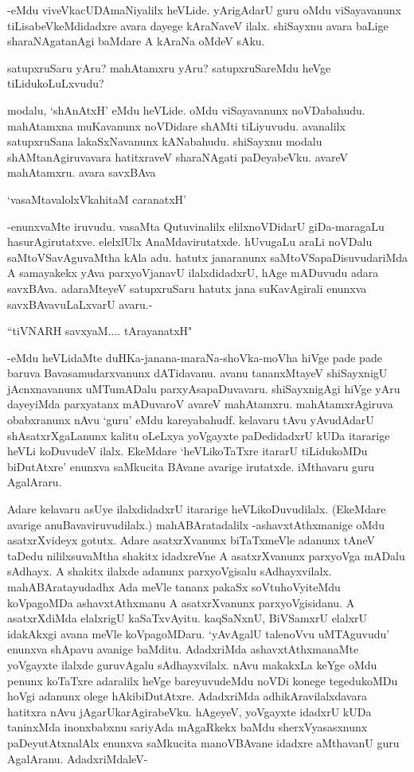 -eMdu viveVkacUDAmaNiyalilx heVLide. yArigAdarU guru oMdu viSayavanunx tiLisabeVkeMdidadxre avara dayege kAraNaveV ilalx. shiSayxnu avara baLige sharaNAgatanAgi baMdare A kAraNa oMdeV sAku.

satupxruSaru yAru? mahAtamxru yAru? satupxruSareMdu heVge tiLidukoLuLxvudu?

modalu, `shAnAtxH' eMdu heVLide. oMdu viSayavanunx noVDabahudu. mahAtamxna muKavanunx noVDidare shAMti tiLiyuvudu. avanalilx satupxruSana lakaSxNavanunx kANabahudu. shiSayxnu modalu shAMtanAgiruvavara hatitxraveV sharaNAgati paDeyabeVku. avareV mahAtamxru. avara savxBAva

\begin{shloka}
`vasaMtavalolxVkahitaM caranatxH'
\end{shloka}

-enunxvaMte iruvudu. vasaMta Qutuvinalilx elilxnoVDidarU giDa-maragaLu hasurAgirutatxve. elelxlUlx AnaMdavirutatxde. hUvugaLu araLi noVDalu saMtoVSavAguvaMtha kAla adu. hatutx janaranunx saMtoVSapaDisuvudariMda A samayakekx yAva parxyoVjanavU ilalxdidadxrU, hAge mADuvudu adara savxBAva. adaraMteyeV satupxruSaru hatutx jana suKavAgirali enunxva savxBAvavuLaLxvarU avaru.-

\begin{shloka}
``tiVNARH savxyaM.... tArayanatxH"
\end{shloka}

-eMdu heVLidaMte duHKa-janana-maraNa-shoVka-moVha hiVge pade pade baruva Bavasamudarxvanunx dATidavanu. avanu tananxMtayeV shiSayxnigU jAcnxnavanunx uMTumADalu parxyAsapaDuvavaru. shiSayxnigAgi hiVge yAru dayeyiMda parxyatanx mADuvaroV avareV mahAtamxru. mahAtamxrAgiruva obabxranunx nAvu `guru' eMdu kareyabahudf. kelavaru tAvu yAvudAdarU shAsatxrXgaLanunx kalitu oLeLxya yoVgayxte paDedidadxrU kUDa itararige heVLi koDuvudeV ilalx. EkeMdare `heVLikoTaTxre itararU tiLidukoMDu biDutAtxre' enunxva saMkucita BAvane avarige irutatxde. iMthavaru guru AgalAraru.

Adare kelavaru asUye ilalxdidadxrU itararige heVLikoDuvudilalx. (EkeMdare avarige anuBavaviruvudilalx.) mahABAratadalilx -ashavxtAthxmanige oMdu asatxrXvideyx gotutx. Adare asatxrXvanunx biTaTxmeVle adanunx tAneV taDedu nililxsuvaMtha shakitx idadxreVne A asatxrXvanunx parxyoVga mADalu sAdhayx. A shakitx ilalxde adanunx parxyoVgisalu sAdhayxvilalx. mahABAratayudadhx Ada meVle tananx pakaSx soVtuhoVyiteMdu koVpagoMDa ashavxtAthxmanu A asatxrXvanunx parxyoVgisidanu. A asatxrXdiMda elalxrigU kaSaTxvAyitu. kaqSaNxnU, BiVSamxrU elalxrU idakAkxgi avana meVle koVpagoMDaru. `yAvAgalU talenoVvu uMTAguvudu' enunxva shApavu avanige baMditu. AdadxriMda ashavxtAthxmanaMte yoVgayxte ilalxde guruvAgalu sAdhayxvilalx. nAvu makakxLa keYge oMdu penunx koTaTxre adaralilx heVge bareyuvudeMdu noVDi konege tegedukoMDu hoVgi adanunx olege hAkibiDutAtxre. AdadxriMda adhikAravilalxdavara hatitxra nAvu jAgarUkarAgirabeVku. hAgeyeV, yoVgayxte idadxrU kUDa taninxMda inonxbabxnu sariyAda mAgaRkekx baMdu sherxVyasasxnunx paDeyutAtxnalAlx enunxva saMkucita manoVBAvane idadxre aMthavanU guru AgalAranu. AdadxriMdaleV-


